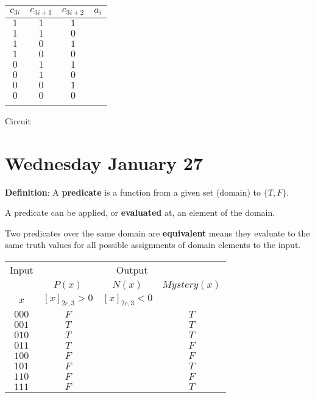 \documentclass[12pt, oneside]{article}
\begin{document}
\begin{center}
\begin{multicols}{2}\begin{tabular}{ccc|c}
$c_{3i}$ & $c_{3i+1}$ & $c_{3i+2}$ & $a_i$ \\
\hline
$1$ & $1$ & $1$ & $\phantom{1}$ \\
$1$ & $1$ & $0$ & $\phantom{1}$ \\
$1$ & $0$ & $1$ & $\phantom{1}$ \\
$1$ & $0$ & $0$ & $\phantom{0}$ \\
$0$ & $1$ & $1$ & $\phantom{1}$ \\
$0$ & $1$ & $0$ & $\phantom{0}$ \\
$0$ & $0$ & $1$ & $\phantom{0}$ \\
$0$ & $0$ & $0$ & $\phantom{0}$ \\\\
\end{tabular}
\columnbreak

Circuit 
\end{multicols}
\end{center}

\newpage
\section*{Wednesday January 27}

{\bf  Definition}: A  {\bf predicate}  is  a function from a given set (domain) to $\{T,F\}$.

A predicate can be applied, or {\bf evaluated} at, an element of the domain.

Two predicates over the same domain are {\bf equivalent} means they evaluate to
the same truth values for all possible assignments of domain elements to the
input.


\begin{center}
\begin{tabular}{c||c|c|c}
Input & \multicolumn{3}{c}{Output} \\
&$P(x)$ & $N(x)$ & $Mystery(x)$\\
$x$ & $[x]_{2c,3} > 0$ & $[x]_{2c,3} < 0$& \\
\hline
$000$  & $F$ & & $T$\\
$001$  & $T$ & & $T$\\
$010$  & $T$ & & $T$\\
$011$  & $T$ & & $F$\\
$100$  & $F$ & & $F$\\
$101$  & $F$ & & $T$\\
$110$  & $F$ & & $F$\\
$111$  & $F$ & & $T$\\
\end{tabular}
\end{center}
\end{document}
